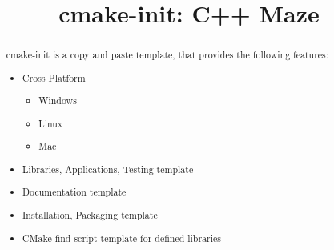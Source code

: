 \documentclass{article}
\begin{document}
\title{cmake-init: C++ Maze}

\maketitle

\begin{abstract}
\noindent
cmake-init is a copy and paste template, that provides the following features:

\begin{itemize}
  \item Cross Platform
  \begin{itemize}
    \item Windows
    \item Linux
    \item Mac
  \end{itemize}
  \item Libraries, Applications, Testing template
  \item Documentation template
  \item Installation, Packaging template
  \item CMake find script template for defined libraries
\end{itemize}

\end{abstract}

\setcounter{tocdepth}{2}
\tableofcontents

\newpage
\end{document}
